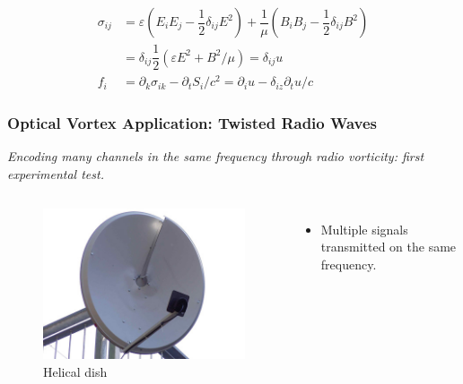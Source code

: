 \documentclass[xcolor=dvipsnames]{beamer}
\newenvironment{items}[1][]
{\begin{itemize}
    \ifthenelse{\isempty{#1}}
    {\setlength{\itemsep}{12pt}}{\setlength{\itemsep}{#1}}}
  {\end{itemize}}
\newcommand{\f}[2]{\dfrac{#1}{#2}} %
\newcommand{\p}[1]{\left(#1\right)} %
\renewcommand{\epsilon}{\varepsilon} %
\renewcommand{\d}{\partial} %
\begin{document}
\begin{frame}
  \begin{align*}
    \sigma_{ij}&=\epsilon\p{E_iE_j-\f12\delta_{ij}E^2}
    +\f1\mu\p{B_iB_j-\f12\delta_{ij}B^2} \\
    &=\delta_{ij}\f12\p{\epsilon
      E^2+B^2/\mu}=\delta_{ij}u\\
    f_i&=\d_k\sigma_{ik}-\d_tS_i/c^2=\d_iu-\delta_{iz}\d_tu/c
  \end{align*}
\end{frame}
\begin{frame}
	\frametitle{Optical Vortex Application: Twisted Radio Waves}
	\begin{center}
		\emph{Encoding many channels in the same frequency through radio
      vorticity: first experimental test.}
	\end{center}
  \begin{columns}[c]
    \begin{figure}
      \centering
      \includegraphics[width=\textwidth]{helical_dish}
      \caption{Helical dish}
    \end{figure}
    \begin{items}
		\item Multiple signals transmitted on the same frequency.
		\end{items}
  \end{columns}
\end{frame}

\end{document}
